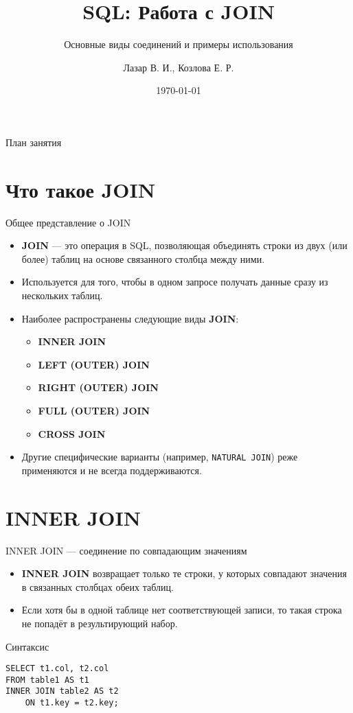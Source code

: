 \documentclass{beamer}
\title{SQL: Работа с JOIN}
\subtitle{Основные виды соединений и примеры использования}
\author{Лазар В. И., Козлова Е. Р.}
\date{\today}
\begin{document}
\begin{frame}
	\titlepage
\end{frame}

\begin{frame}{План занятия}
	\tableofcontents
\end{frame}

\section{Что такое JOIN}
\begin{frame}{Общее представление о JOIN}
	\begin{itemize}
		\item \textbf{JOIN} — это операция в SQL, позволяющая объединять строки из двух (или более) таблиц
		      на основе связанного столбца между ними.
		\item Используется для того, чтобы в одном запросе получать данные сразу из нескольких таблиц.
		\item Наиболее распространены следующие виды \textbf{JOIN}:
		      \begin{itemize}
			      \item \textbf{INNER JOIN}
			      \item \textbf{LEFT (OUTER) JOIN}
			      \item \textbf{RIGHT (OUTER) JOIN}
			      \item \textbf{FULL (OUTER) JOIN}
			      \item \textbf{CROSS JOIN}
		      \end{itemize}
		\item Другие специфические варианты (например, \texttt{NATURAL JOIN}) реже применяются и не всегда поддерживаются.
	\end{itemize}
\end{frame}

\section{INNER JOIN}
\begin{frame}[fragile]{INNER JOIN — соединение по совпадающим значениям}
	\begin{itemize}
		\item \textbf{INNER JOIN} возвращает только те строки, у которых совпадают значения в связанных столбцах обеих таблиц.
		\item Если хотя бы в одной таблице нет соответствующей записи,
		      то такая строка не попадёт в результирующий набор.
	\end{itemize}
	\begin{block}{Синтаксис}
		\begin{verbatim}
SELECT t1.col, t2.col
FROM table1 AS t1
INNER JOIN table2 AS t2
    ON t1.key = t2.key;
\end{verbatim}
	\end{block}
\end{frame}
\end{document}
